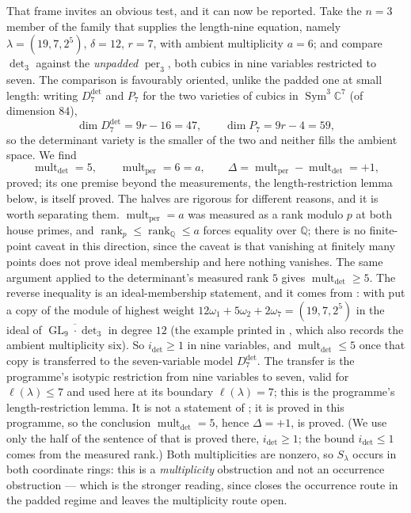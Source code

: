 \documentclass[11pt]{amsart}
\theoremstyle{plain}
\theoremstyle{definition}
\theoremstyle{remark}
\DeclareMathOperator{\GL}{GL}
\DeclareMathOperator{\Sym}{Sym}
\DeclareMathOperator{\mult}{mult}
\DeclareMathOperator{\per}{per}
\DeclareMathOperator{\rank}{rank}
\newcommand{\bC}{\mathbb{C}}
\newcommand{\bQ}{\mathbb{Q}}
\newcommand{\Pp}{P}
\newcommand{\Ddet}{D^{\det}}
\begin{document}
That frame invites an obvious test, and it can now be reported.  Take the
$n=3$ member of the family that supplies the length-nine equation, namely
$\lambda=(19,7,2^{5})$, $\delta=12$, $r=7$, with ambient multiplicity $a=6$; and
compare $\det_3$ against the \emph{unpadded} $\per_3$, both cubics in nine
variables restricted to seven.  The comparison is favourably oriented, unlike
the padded one at small length: writing $\Ddet_7$ and $\Pp_7$ for the two
varieties of cubics in $\Sym^{3}\bC^{7}$ (of dimension $84$),
\[
  \dim\Ddet_7 = 9r-16 = 47 ,\qquad \dim\Pp_7 = 9r-4 = 59 ,
\]
so the determinant variety is the smaller of the two and neither fills the
ambient space.  We find
\[
  \mult\nolimits_{\det}=5,\qquad \mult\nolimits_{\per}=6=a ,\qquad
  \Delta = \mult\nolimits_{\per}-\mult\nolimits_{\det} = +1 ,
\]
proved; its one premise beyond the measurements, the length-restriction lemma below, is itself proved.  The halves are rigorous for
different reasons, and it is worth separating them.  $\mult_{\per}=a$ was
measured as a rank modulo $p$ at both house primes, and
$\rank_p\le\rank_\bQ\le a$ forces equality over $\bQ$; there is no
finite-point caveat in this direction, since the caveat is that vanishing at
finitely many points does not prove ideal membership and here nothing vanishes.
The same argument applied to the determinant's measured rank $5$ gives
$\mult_{\det}\ge5$.  The reverse inequality is an ideal-membership statement,
and it comes from \cite{LMR}: \cite[Thm.~2.3.1]{LMR} with \cite[Thm.~3.1.1 and
\S3.2]{LMR} put a copy of the module of highest weight
$12\omega_1+5\omega_2+2\omega_7=(19,7,2^{5})$ in the ideal of
$\overline{\GL_9\cdot\det_3}$ in degree $12$ (the example printed in
\cite[\S3.2]{LMR}, which also records the ambient multiplicity six).  So
$i_{\det}\ge1$ in nine variables, and $\mult_{\det}\le5$ once that copy is
transferred to the seven-variable model $\Ddet_7$.  The transfer is the
programme's isotypic restriction from nine variables to seven, valid for
$\ell(\lambda)\le7$ and used here at its boundary $\ell(\lambda)=7$; this is the
programme's length-restriction lemma.  It is not a statement of \cite{LMR}; it is proved in this programme, so the conclusion
$\mult_{\det}=5$, hence $\Delta=+1$, is proved.  (We use only
the half of the sentence of \cite[\S3.2]{LMR} that is proved there,
$i_{\det}\ge1$; the bound $i_{\det}\le1$ comes from the measured rank.)  Both
multiplicities are nonzero, so
$S_\lambda$ occurs in both coordinate rings: this is a \emph{multiplicity}
obstruction and not an occurrence obstruction --- which is the stronger reading,
since \cite{BIP} closes the occurrence route in the padded regime and leaves the
multiplicity route open.
\end{document}

